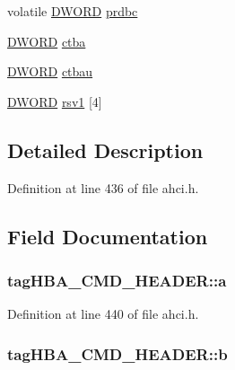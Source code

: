 \begin{DoxyCompactItemize}
\item 
volatile \hyperlink{ahci_8h_af483253b2143078cede883fc3c111ad2}{D\+W\+O\+RD} \hyperlink{structtagHBA__CMD__HEADER_a9ad2e7d3a851051ab4387420a9f00b84}{prdbc}
\item 
\hyperlink{ahci_8h_af483253b2143078cede883fc3c111ad2}{D\+W\+O\+RD} \hyperlink{structtagHBA__CMD__HEADER_a23dac028da6e65c527334115cc308cbd}{ctba}
\item 
\hyperlink{ahci_8h_af483253b2143078cede883fc3c111ad2}{D\+W\+O\+RD} \hyperlink{structtagHBA__CMD__HEADER_ae7a7bf6238069c6a3149cafb38de2358}{ctbau}
\item 
\hyperlink{ahci_8h_af483253b2143078cede883fc3c111ad2}{D\+W\+O\+RD} \hyperlink{structtagHBA__CMD__HEADER_a5bedafeec01a2e7db8f36591fe48c142}{rsv1} \mbox{[}4\mbox{]}
\end{DoxyCompactItemize}


\subsection{Detailed Description}


Definition at line 436 of file ahci.\+h.



\subsection{Field Documentation}
\subsubsection[{\texorpdfstring{a}{a}}]{ tag\+H\+B\+A\+\_\+\+C\+M\+D\+\_\+\+H\+E\+A\+D\+E\+R\+::a}\hypertarget{structtagHBA__CMD__HEADER_ac07bb464769560ba80f2fdf92917a3a5}{}\label{structtagHBA__CMD__HEADER_ac07bb464769560ba80f2fdf92917a3a5}


Definition at line 440 of file ahci.\+h.

\subsubsection[{\texorpdfstring{b}{b}}]{ tag\+H\+B\+A\+\_\+\+C\+M\+D\+\_\+\+H\+E\+A\+D\+E\+R\+::b}\hypertarget{structtagHBA__CMD__HEADER_a457f51749a36f13b1670185f113f55f9}{}\label{structtagHBA__CMD__HEADER_a457f51749a36f13b1670185f113f55f9}


